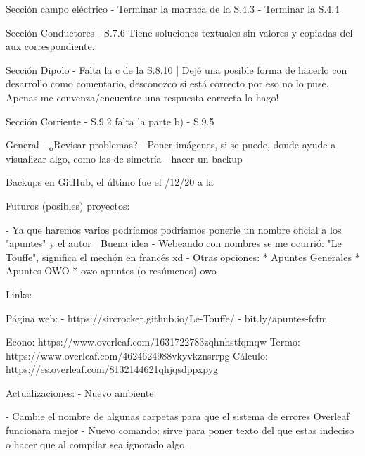 Sección campo eléctrico
- Terminar la matraca de la S.4.3
- Terminar la S.4.4


Sección Conductores
- S.7.6 Tiene soluciones textuales sin valores y copiadas del aux correspondiente. 


Sección Dipolo
- Falta la c de la S.8.10 | Dejé una posible forma de hacerlo con desarrollo como comentario, desconozco si está correcto por eso no lo puse. Apenas me convenza/encuentre una respuesta correcta lo hago!


Sección Corriente
- S.9.2 falta la parte b)
- S.9.5 


General
- ¿Revisar problemas?
- Poner imágenes, si se puede, donde ayude a visualizar algo, como las de simetría
- hacer un backup 


Backups en GitHub, el último fue el /12/20 a la



Futuros (posibles) proyectos:

- Ya que haremos varios podríamos podríamos ponerle un nombre oficial a los "apuntes" y el autor | Buena idea
    - Webeando con nombres se me ocurrió: "Le Touffe", significa el mechón en francés xd
    - Otras opciones: * Apuntes Generales
                      * Apuntes OWO
                      * owo apuntes (o resúmenes) owo


Links:

Página web:
    - https://sircrocker.github.io/Le-Touffe/
    - bit.ly/apuntes-fcfm

Econo: https://www.overleaf.com/1631722783zqhnhstfqmqw
Termo: https://www.overleaf.com/4624624988vkyvkznsrrpg
Cálculo: https://es.overleaf.com/8132144621qhjqsdppxpyg







Actualizaciones:
- Nuevo ambiente \begin{eqit} \end{eqit}
- Cambie el nombre de algunas carpetas para que el sistema de errores Overleaf funcionara mejor
- Nuevo comando: \indeciso{}{} sirve para poner texto del que estas indeciso o hacer que al compilar sea ignorado algo.

